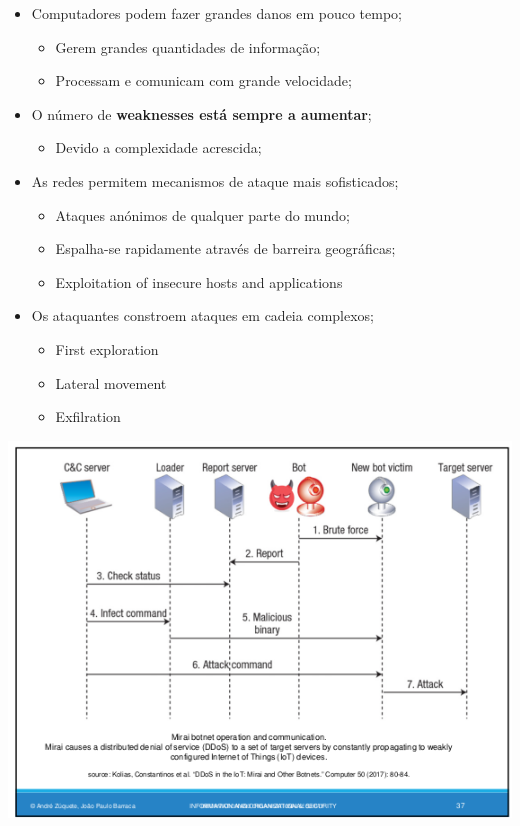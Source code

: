 \documentclass{article}
\begin{document}
\begin{flushleft}
  \begin{itemize}
    \item Computadores podem fazer grandes danos em pouco tempo;
    \begin{itemize}
      \item Gerem grandes quantidades de informação;
      \item Processam e comunicam com grande velocidade;
    \end{itemize}
    \item O número de \textbf{weaknesses está sempre a aumentar};
    \begin{itemize}
      \item Devido a complexidade acrescida;
    \end{itemize}
    \item As redes permitem mecanismos de ataque mais sofisticados;
    \begin{itemize}
      \item Ataques anónimos de qualquer parte do mundo;
      \item Espalha-se rapidamente através de barreira geográficas;
      \item Exploitation of insecure hosts and applications
    \end{itemize}
    \item Os ataquantes constroem ataques em cadeia complexos;
    \begin{itemize}
      \item First exploration
      \item Lateral movement
      \item Exfilration
    \end{itemize}
  \end{itemize}

  \pagebreak

  \begin{center}
    \includegraphics[scale=0.4]{8}
  \end{center}


\end{flushleft}
\end{document}
